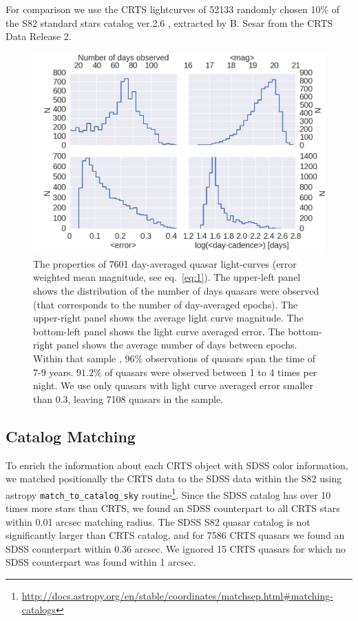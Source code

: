 \documentclass[fleqn,usenatbib]{mnras}  %
\begin{document}
For comparison we use the CRTS lightcurves of 52133 randomly chosen  10\% of the S82 standard stars catalog ver.2.6 \citep{ivezic2007}, extracted by B. Sesar from the CRTS Data Release 2.

\begin{figure}
\label{fig:1}
 \includegraphics[width=\columnwidth]{Fig_1_QSO_CRTS_AVG_stats_USED_data_four_panels.png}
 \caption{The properties of 7601 day-averaged  quasar light-curves (error weighted mean magnitude, see eq.~\ref{eq:1}). The upper-left panel shows the distribution of the number of days quasars were observed (that corresponds to the number of day-averaged epochs). The upper-right panel shows the average light curve magnitude. The bottom-left panel shows the light curve averaged error. The bottom-right panel shows the average number of days between epochs. Within that sample , $96 \% $ observations of quasars span the time of 7-9 years.  $91.2\%$ of  quasars were observed between 1 to 4 times per night. We use only quasars with light curve averaged error smaller than 0.3, leaving 7108 quasars in the sample.}
\end{figure}



\subsection{Catalog Matching}
To enrich the information about each CRTS object with SDSS color information, we matched positionally the CRTS data to the SDSS data within the S82 using astropy \citep{robitaille2013} \verb|match_to_catalog_sky|  routine\footnote{\url{http://docs.astropy.org/en/stable/coordinates/matchsep.html\#matching-catalogs}}.  
Since the SDSS catalog has over 10 times more stars than CRTS, we found an SDSS counterpart to all  CRTS stars within 0.01 arcsec matching radius. The SDSS S82 quasar catalog is not significantly larger than CRTS catalog, and for 7586 CRTS quasars we found an SDSS counterpart within 0.36 arcsec.   We  ignored  15 CRTS quasars for which no SDSS counterpart was found within 1 arcsec.  
\end{document}
